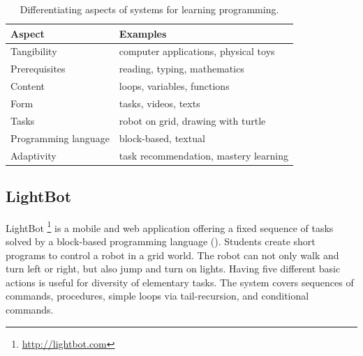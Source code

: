 \begin{table}[htb]
\centering
\caption{Differentiating aspects of systems for learning programming.}
\begin{tabular}{l l}
\toprule
Aspect & Examples \\
\midrule
Tangibility & computer applications, physical toys \\
Prerequisites & reading, typing, mathematics \\
Content & loops, variables, functions \\
Form & tasks, videos, texts \\ %
Tasks & robot on grid, drawing with turtle \\
Programming language & block-based, textual \\
Adaptivity & task recommendation, mastery learning \\
\bottomrule
\end{tabular}
\label{tbl:existing-systems-categorization}
\end{table}





\subsection{LightBot}
\label{sec:lightbot}
LightBot%
\footnote{\url{http://lightbot.com}}
is a mobile and web application offering a fixed sequence of tasks solved by
a block-based programming language
().
Students create short programs to control a robot in a grid world.
The robot can not only walk and turn left or right, but also jump and turn on lights.
Having five different basic actions is useful for diversity of elementary tasks.
The system covers sequences of commands, procedures, simple loops via tail-recursion,
and conditional commands.

%


